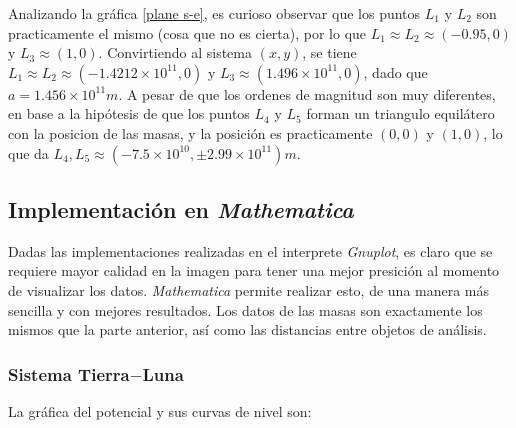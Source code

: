 Analizando la gráfica \ref{plane s-e}, es curioso observar que los puntos $L_1$ y $L_2$ son practicamente el mismo (cosa que no es cierta), por lo que $L_1 \approx L_2 \approx (-0.95,0)$ y $L_3 \approx (1,0)$. Convirtiendo al sistema $(x,y)$, se tiene $L_1 \approx L_2 \approx (-1.4212\times 10^{11},0)$ y $L_3 \approx (1.496\times 10^{11},0)$, dado que $a = 1.456\times 10^{11}m$. A pesar de que los ordenes de magnitud son muy diferentes, en base a la hipótesis de que los puntos $L_4$ y $L_5$ forman un triangulo equilátero con la posicion de las masas, y la posición es practicamente $(0,0)$ y $(1,0)$, lo que da $L_4, L_5 \approx (-7.5\times 10^{10},\pm 2.99\times 10^{11}) m$.




\subsection{Implementación en \textit{Mathematica}}

Dadas las implementaciones realizadas en el interprete \textit{Gnuplot}, es claro que se requiere mayor calidad en la imagen para tener una mejor presición al momento de visualizar los datos. \textit{Mathematica} permite realizar esto, de una manera más sencilla y con mejores resultados. Los datos de las masas son exactamente los mismos que la parte anterior, así como las distancias entre objetos de análisis.



\subsubsection{Sistema Tierra$-$Luna}
La gráfica del potencial y sus curvas de nivel son:

